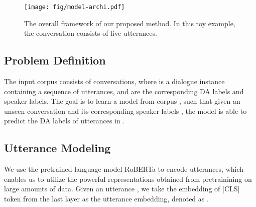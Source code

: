 \documentclass[11pt]{article}
\begin{document}
\begin{figure}[ht]
    \centering
    \texttt{[image: fig/model-archi.pdf]}
    \caption{The overall framework of our proposed method. In this toy example, the conversation consists of five utterances.}
    \label{fig:archi}
\end{figure}


\subsection{Problem Definition}
The input corpus  consists of  conversations, where  is a dialogue instance containing a sequence of  utterances,  and  are the corresponding DA labels and speaker labels. The goal is to learn a model from corpus , such that given an unseen conversation  and its corresponding speaker labels , the model is able to predict the DA labels  of utterances in .

\subsection{Utterance Modeling}
We use the pretrained language model RoBERTa to encode utterances, which enables us to utilize the powerful representations obtained from pretrainining on large amounts of data. Given an utterance , we take the embedding of [CLS] token from the last layer as the utterance embedding, denoted as .
\end{document}
